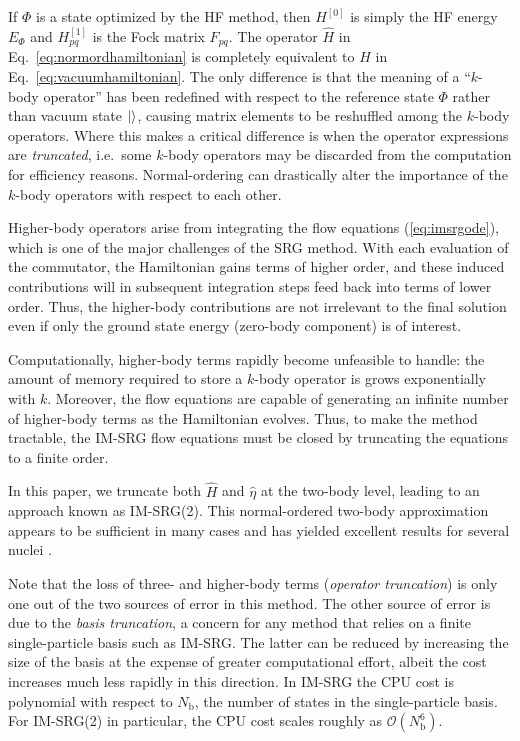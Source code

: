 If $\Phi$ is a state optimized by the HF method, then $H^{[0]}$ is
simply the HF energy $E_\Phi$ and $H^{[1]}_{pq}$ is the Fock matrix
$F_{pq}$.  The operator $\hat H$ in
Eq.~\eqref{eq:normordhamiltonian} is completely equivalent to $\hat H$
in Eq.~\eqref{eq:vacuumhamiltonian}.  The only difference is that the
meaning of a ``$k$-body operator'' has been redefined with respect to
the reference state $\Phi$ rather than vacuum state $|  \rangle$, causing
matrix elements to be reshuffled among the $k$-body operators.  Where
this makes a critical difference is when the operator expressions
are \emph{truncated}, i.e.\ some $k$-body operators may be discarded
from the computation for efficiency reasons.  Normal-ordering can
drastically alter the importance of the $k$-body operators with
respect to each other.

Higher-body operators arise from integrating the flow equations
(\ref{eq:imsrgode}), which is one of the major challenges of the SRG
method.  With each evaluation of the commutator, the Hamiltonian gains
terms of higher order, and these induced contributions will in
subsequent integration steps feed back into terms of lower order.
Thus, the higher-body contributions are not irrelevant to the final
solution even if only the ground state energy (zero-body component) is
of interest.

Computationally, higher-body terms rapidly become unfeasible to
handle: the amount of memory required to store a $k$-body operator is
grows exponentially with $k$.  Moreover, the flow equations are
capable of generating an infinite number of higher-body terms as the
Hamiltonian evolves.  Thus, to make the method tractable, the IM-SRG
flow equations must be closed by truncating the equations to a finite
order.

In this paper, we truncate both $\hat{H}$ and $\hat{\eta}$ at the
two-body level, leading to an approach known as IM-SRG(2).  This
normal-ordered two-body approximation appears to be sufficient in many
cases and has yielded excellent results for several
nuclei \cite{PhysRevLett.106.222502,PhysRevLett.109.052501,IMSRG}.

Note that the loss of three- and higher-body terms (\textit{operator
truncation}) is only one out of the two sources of error in this
method.  The other source of error is due to the \textit{basis
truncation}, a concern for any method that relies on a finite
single-particle basis such as IM-SRG.  The latter can be reduced by
increasing the size of the basis at the expense of greater
computational effort, albeit the cost increases much less rapidly in
this direction.  In IM-SRG the CPU cost is polynomial with respect to
$N_{\mathrm{b}}$, the number of states in the single-particle basis.
For IM-SRG(2) in particular, the CPU cost scales roughly as
$\mathcal{O}(N_{\mathrm{b}}^6)$.

